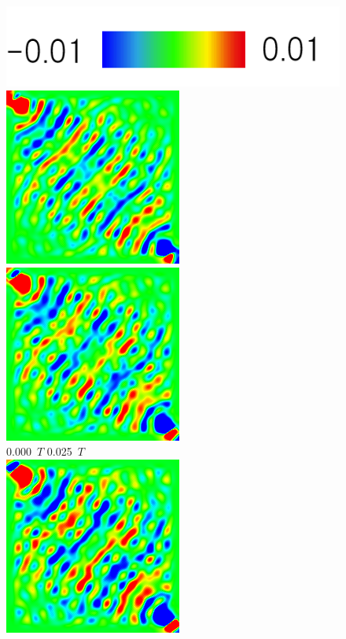 \documentclass[a4j, twocolumn]{jsarticle}
\begin{document}
\begin{figure}
\centering
\includegraphics[width=0.4\hsize]{./figures/colorbar_001.png} \\
\includegraphics[width=0.4\hsize]{./figures/capture/sin/sinsqr128_32i_l_dif_5760} \ 
\includegraphics[width=0.4\hsize]{./figures/capture/sin/sinsqr128_32i_l_dif_5761} \\
0.000\ $T$ \hspace*{0.25\hsize} 0.025\ $T$  \vspace{5pt}\\
\includegraphics[width=0.4\hsize]{./figures/capture/sin/sinsqr128_32i_l_dif_5762} \ 

\end{figure}
\end{document}
